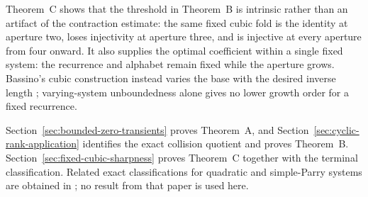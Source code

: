 Theorem~C shows that the threshold in Theorem~B is intrinsic rather than an
artifact of the contraction estimate: the same fixed cubic fold is the
identity at aperture two, loses injectivity at aperture three, and is
injective at every aperture from four onward.  It also supplies the optimal
coefficient within a single fixed system: the recurrence and alphabet remain
fixed while the aperture grows.  Bassino's cubic construction instead varies
the base with the desired inverse length
\cite{Bassino2002}; varying-system unboundedness alone gives no lower growth
order for a fixed recurrence.

Section~\ref{sec:bounded-zero-transients} proves Theorem~A, and
Section~\ref{sec:cyclic-rank-application} identifies the exact collision
quotient and proves Theorem~B.  Section~\ref{sec:fixed-cubic-sharpness}
proves Theorem~C together with the terminal classification.  Related exact
classifications for quadratic and simple-Parry systems are obtained in
\cite{MaZhang2026ExactOverlap}; no result from that paper is used here.
